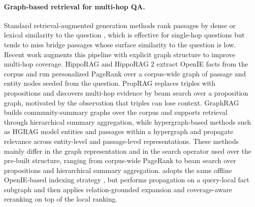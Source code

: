 \paragraph{Graph-based retrieval for multi-hop QA.}
Standard retrieval-augmented generation methods rank passages by dense
or lexical similarity to the question
\citep{karpukhin2020dpr,robertson2009bm25}, which is effective for
single-hop questions but tends to miss bridge passages whose surface
similarity to the question is low. Recent work augments this pipeline
with explicit graph structure to improve multi-hop coverage.
HippoRAG \citep{jimenez2024hipporag} and HippoRAG 2
\citep{gutierrez2025hipporag} extract OpenIE facts from the corpus and
run personalized PageRank over a corpus-wide graph of passage and
entity nodes seeded from the question. PropRAG \citep{wang2025proprag}
replaces triples with propositions and discovers multi-hop evidence by
beam search over a proposition graph, motivated by the observation that
triples can lose context. GraphRAG \citep{edge2024graphrag} builds
community-summary graphs over the corpus and supports retrieval through
hierarchical summary aggregation, while hypergraph-based methods such
as HGRAG \citep{hgrag2024} model entities and passages within a
hypergraph and propagate relevance across entity-level and
passage-level representations. These methods mainly differ in the graph
representation and in the search operator used over the pre-built
structure, ranging from corpus-wide PageRank to beam search over
propositions and hierarchical summary aggregation. \methodname{} adopts
the same offline OpenIE-based indexing strategy
\citep{angeli2015leveraging,gutierrez2025hipporag}, but performs
propagation on a query-local fact subgraph and then applies
relation-grounded expansion and coverage-aware reranking on top of the
local ranking.

